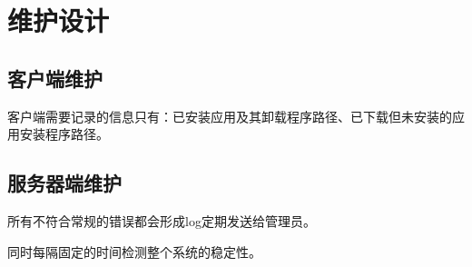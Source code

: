 \chapter{维护设计}
\section{客户端维护}
客户端需要记录的信息只有：已安装应用及其卸载程序路径、已下载但未安装的应用安装程序路径。

\section{服务器端维护}
所有不符合常规的错误都会形成log定期发送给管理员。

同时每隔固定的时间检测整个系统的稳定性。
